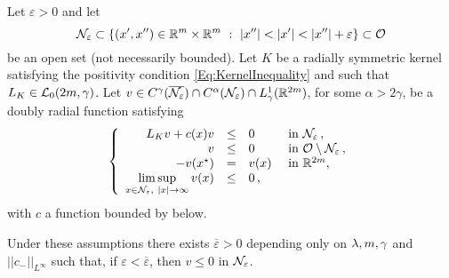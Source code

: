 \begin{proposition}
	\label{Prop:MaximumPrincipleNarrowDomainsOdd}
	Let $\varepsilon>0$ and let
	$$
	\ncal_\varepsilon \subset \{(x',x'')\in \R^m\times\R^m \ : \ |x''|<|x'|<|x''|+ \varepsilon\} \subset \ocal
	$$ 
	be an open set (not necessarily bounded).  
	Let $K$ be a radially symmetric kernel satisfying the positivity condition \eqref{Eq:KernelInequality} and such that $L_K\in \mathcal{L}_0(2m,\gamma)$. Let $v\in C^\gamma(\overline{\mathcal{N}_\varepsilon})\cap C^\alpha(\mathcal{N}_\varepsilon)\cap L^1_\gamma(\mathbb{R}^{2m})$, for some $\alpha > 2\gamma$, be a doubly radial function satisfying
	\begin{equation}
	\label{Eq:AssumptionsMaxPNarrow}
	\left\{\begin{array}{rcll}
	L_K v + c(x)v&\leq & 0 &\textrm{ in } \mathcal{N}_\varepsilon\,,\\
	v &\leq & 0 &\textrm{ in } \mathcal{O} \setminus \mathcal{N}_\varepsilon\,,\\
	- v(x^\star) & = & v(x) &\textrm{ in } \mathbb{R}^{2m},\\
	\displaystyle \limsup_{x\in \mathcal{N}_\varepsilon, \ |x|\to \infty} v(x) &\leq & 0\,,
	\end{array} \right.
	\end{equation}
	with $c$ a function bounded by below.
	
	Under these assumptions there exists $\overline{\varepsilon}>0$ depending only on $\lambda, m, \gamma$ and $||c_-||_{L^\infty}$ such that, if $\varepsilon<\overline{\varepsilon}$, then $v \leq 0$ in $\mathcal{N}_\varepsilon$. 
\end{proposition}

